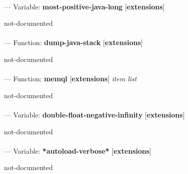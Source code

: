 \paragraph{}
\label{EXTENSIONS:MOST-POSITIVE-JAVA-LONG}
--- Variable: \textbf{most-positive-java-long} [\textbf{extensions}] \textit{}

\begin{adjustwidth}{5em}{5em}
not-documented
\end{adjustwidth}

\paragraph{}
\label{EXTENSIONS:DUMP-JAVA-STACK}
--- Function: \textbf{dump-java-stack} [\textbf{extensions}] \textit{}

\begin{adjustwidth}{5em}{5em}
not-documented
\end{adjustwidth}

\paragraph{}
\label{EXTENSIONS:MEMQL}
--- Function: \textbf{memql} [\textbf{extensions}] \textit{item list}

\begin{adjustwidth}{5em}{5em}
not-documented
\end{adjustwidth}

\paragraph{}
\label{EXTENSIONS:DOUBLE-FLOAT-NEGATIVE-INFINITY}
--- Variable: \textbf{double-float-negative-infinity} [\textbf{extensions}] \textit{}

\begin{adjustwidth}{5em}{5em}
not-documented
\end{adjustwidth}

\paragraph{}
\label{EXTENSIONS:*AUTOLOAD-VERBOSE*}
--- Variable: \textbf{*autoload-verbose*} [\textbf{extensions}] \textit{}

\begin{adjustwidth}{5em}{5em}
not-documented
\end{adjustwidth}

